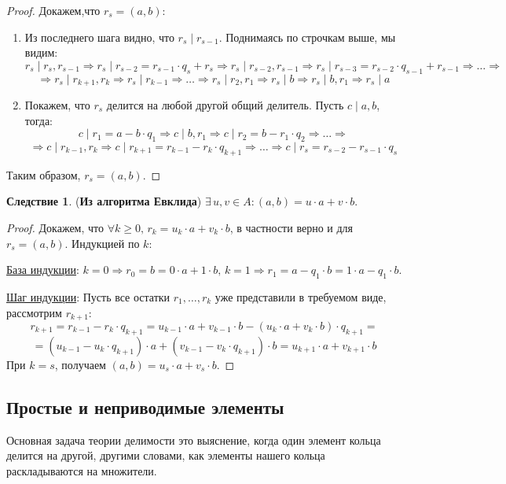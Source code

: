 \documentclass[12pt]{article}
\theoremstyle{definition}
\newtheorem{corollary}{Следствие}
\begin{document}
\begin{proof}
	Докажем,что $r_s = (a,b)$:
	\begin{enumerate}[label=\arabic*)]
		\item Из последнего шага видно, что $r_s \mid r_{s-1}$. Поднимаясь по строчкам выше, мы видим:
		$$
			r_s \mid r_s, r_{s-1} \Rightarrow r_s \mid r_{s-2} = r_{s-1}{\cdot}q_s + r_s \Rightarrow r_s \mid r_{s -2}, r_{s-1} \Rightarrow r_s \mid r_{s - 3} = r_{s-2}{\cdot}q_{s-1} + r_{s-1} \Rightarrow \dotsc \Rightarrow
		$$
		$$
			\Rightarrow r_s \mid r_{k+1}, r_k \Rightarrow r_s \mid r_{k-1} \Rightarrow \dotsc \Rightarrow r_s \mid r_2,r_1 \Rightarrow r_s \mid b \Rightarrow r_s \mid b,r_1 \Rightarrow r_s\mid a
		$$
		\item Покажем, что $r_s$ делится на любой другой общий делитель. Пусть $c \mid a,b$, тогда:
		$$
			c \mid r_1 = a - b{\cdot}q_1 \Rightarrow c \mid b,r_1 \Rightarrow c \mid r_2 = b - r_1{\cdot}q_2 \Rightarrow \dotsc \Rightarrow 
		$$
		$$
			\Rightarrow c \mid r_{k-1},r_k \Rightarrow c \mid r_{k+1} = r_{k-1} - r_k{\cdot}q_{k+1} \Rightarrow \dotsc \Rightarrow c \mid r_s = r_{s-2} - r_{s-1}{\cdot}q_s 
		$$
	\end{enumerate}
	Таким образом, $r_s = (a,b)$.
\end{proof}
\begin{corollary}(\textbf{Из алгоритма Евклида}) 
	$\exists \, u,v \in A \colon (a,b) = u{\cdot}a + v{\cdot}b$.
\end{corollary}
\begin{proof}
	Докажем, что $\forall k \geq 0, \, r_k = u_k{\cdot}a + v_k{\cdot}b$, в частности верно и для $r_s = (a,b)$. Индукцией по $k$:
	
	\uline{База индукции}: $k = 0 \Rightarrow r_0 = b= 0{\cdot}a + 1{\cdot}b, \, k = 1 \Rightarrow r_1 = a - q_1{\cdot}b = 1{\cdot}a - q_1{\cdot}b$.
	
	\uline{Шаг индукции}: Пусть все остатки $r_1,\dotsc, r_k$ уже представили в требуемом виде, рассмотрим $r_{k+1}$:
	$$
		r_{k+1} = r_{k-1} - r_k{\cdot}q_{k+1} = u_{k-1}{\cdot}a + v_{k-1}{\cdot}b - (u_k{\cdot}a + v_k{\cdot}b){\cdot}q_{k+1} = 
	$$	
	$$
		= (u_{k-1} - u_k{\cdot}q_{k+1}){\cdot}a + (v_{k-1} - v_k{\cdot}q_{k+1}){\cdot}b =u_{k+1}{\cdot}a + v_{k+1}{\cdot}b
	$$
	При $k = s$, получаем $(a,b) = u_s{\cdot}a + v_s{\cdot}b$.
\end{proof}

\subsection*{Простые и неприводимые элементы}
Основная задача теории делимости это выяснение, когда один элемент кольца делится на другой, другими словами, как элементы нашего кольца раскладываются на множители.
\end{document}
